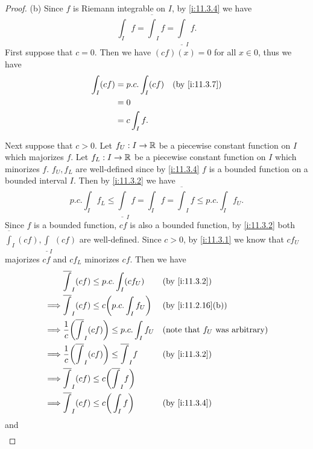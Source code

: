 \begin{proof}{(b)}
  Since \(f\) is Riemann integrable on \(I\), by \cref{i:11.3.4} we have
  \[
    \int_I f = \overline{\int}_I f = \underline{\int}_I f.
  \]
  First suppose that \(c = 0\).
  Then we have \((cf)(x) = 0\) for all \(x \in 0\), thus we have
  \begin{align*}
    \int_I (cf) & = p.c. \int_I (cf) &  & \by{i:11.3.7} \\
                & = 0                                   \\
                & = c \int_I f.
  \end{align*}

  Next suppose that \(c > 0\).
  Let \(f_U : I \to \mathbb{R}\) be a piecewise constant function on \(I\) which majorizes \(f\).
  Let \(f_L : I \to \mathbb{R}\) be a piecewise constant function on \(I\) which minorizes \(f\).
  \(f_U, f_L\) are well-defined since by \cref{i:11.3.4} \(f\) is a bounded function on a bounded interval \(I\).
  Then by \cref{i:11.3.2} we have
  \[
    p.c. \int_I f_L \leq \underline{\int}_I f = \int_I f = \overline{\int}_I f \leq p.c. \int_I f_U.
  \]
  Since \(f\) is a bounded function, \(cf\) is also a bounded function, by \cref{i:11.3.2} both \(\overline{\int}_I (cf), \underline{\int}_I (cf)\) are well-defined.
  Since \(c > 0\), by \cref{i:11.3.1} we know that \(c f_U\) majorizes \(c f\) and \(c f_L\) minorizes \(c f\).
  Then we have
  \begin{align*}
             & \overline{\int}_I (cf) \leq p.c. \int_I (c f_U)                          &  & \by{i:11.3.2}                            \\
    \implies & \overline{\int}_I (cf) \leq c \bigg(p.c. \int_I f_U\bigg)                &  & \by{i:11.2.16}[b]                        \\
    \implies & \dfrac{1}{c} \bigg(\overline{\int}_I (cf)\bigg) \leq p.c. \int_I f_U     &  & \text{(note that \(f_U\) was arbitrary)} \\
    \implies & \dfrac{1}{c} \bigg(\overline{\int}_I (cf)\bigg) \leq \overline{\int}_I f &  & \by{i:11.3.2}                            \\
    \implies & \overline{\int}_I (cf) \leq c\bigg(\overline{\int}_I f\bigg)                                                           \\
    \implies & \overline{\int}_I (cf) \leq c\bigg(\int_I f\bigg)                        &  & \by{i:11.3.4}
  \end{align*}
  and
  \begin{align*}

\end{align*}
\end{proof}
